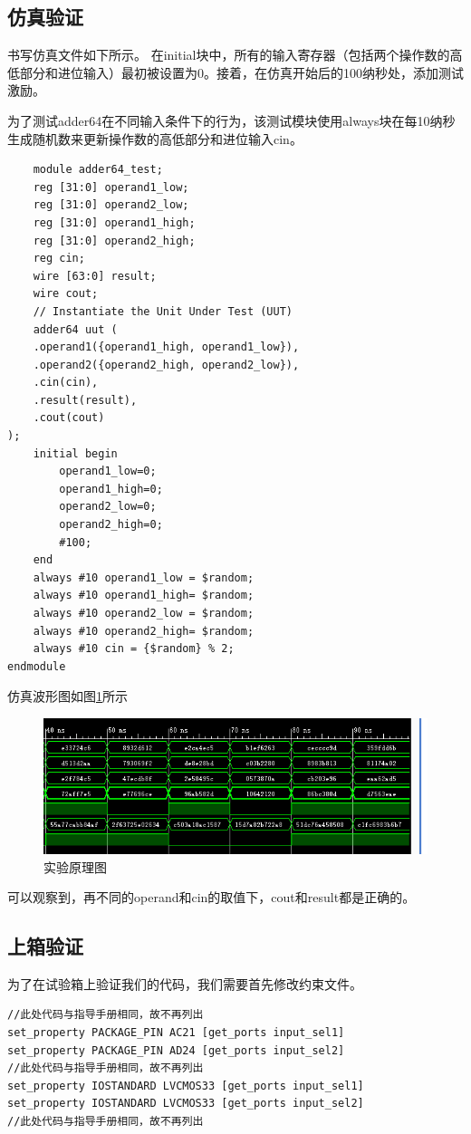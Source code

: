 \documentclass{ctexart}
\begin{document}
\subsection{仿真验证}
书写仿真文件如下所示。
在initial块中，所有的输入寄存器（包括两个操作数的高低部分和进位输入）最初被设置为0。接着，在仿真开始后的100纳秒处，添加测试激励。

为了测试adder64在不同输入条件下的行为，该测试模块使用always块在每10纳秒生成随机数来更新操作数的高低部分和进位输入cin。
\begin{verbatim}
    module adder64_test;
    reg [31:0] operand1_low;
    reg [31:0] operand2_low;
    reg [31:0] operand1_high;
    reg [31:0] operand2_high;
    reg cin;
    wire [63:0] result;
    wire cout;
    // Instantiate the Unit Under Test (UUT)
    adder64 uut (
    .operand1({operand1_high, operand1_low}), 
    .operand2({operand2_high, operand2_low}), 
    .cin(cin), 
    .result(result), 
    .cout(cout)
);
    initial begin
        operand1_low=0;
        operand1_high=0;
        operand2_low=0;
        operand2_high=0;
        #100;
    end
    always #10 operand1_low = $random;
    always #10 operand1_high= $random;
    always #10 operand2_low = $random;
    always #10 operand2_high= $random;
    always #10 cin = {$random} % 2;
endmodule
\end{verbatim}

仿真波形图如图\ref{wave}所示
\begin{figure}[ht]
    \centering
    \includegraphics[width=1\textwidth]{./figures/wave.png}
    \caption{实验原理图}
    \label{wave}
\end{figure}

可以观察到，再不同的operand和cin的取值下，cout和result都是正确的。
\subsection{上箱验证}
为了在试验箱上验证我们的代码，我们需要首先修改约束文件。
\begin{verbatim}
//此处代码与指导手册相同，故不再列出
set_property PACKAGE_PIN AC21 [get_ports input_sel1]
set_property PACKAGE_PIN AD24 [get_ports input_sel2]
//此处代码与指导手册相同，故不再列出
set_property IOSTANDARD LVCMOS33 [get_ports input_sel1]
set_property IOSTANDARD LVCMOS33 [get_ports input_sel2]
//此处代码与指导手册相同，故不再列出
\end{verbatim}
\end{document}
